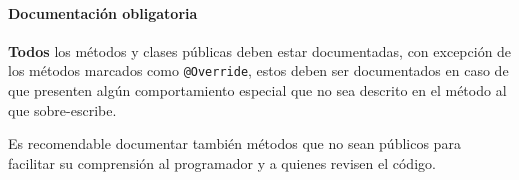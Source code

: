     \paragraph{Documentación obligatoria}
      \textbf{Todos} los métodos y clases públicas deben estar documentadas, con excepción
      de los métodos marcados como \texttt{@Override}, estos deben ser 
      documentados en caso de que presenten algún comportamiento especial que no sea 
      descrito en el método al que sobre-escribe.

      Es recomendable documentar también métodos que no sean públicos para facilitar su 
      comprensión al programador y a quienes revisen el código.
%
